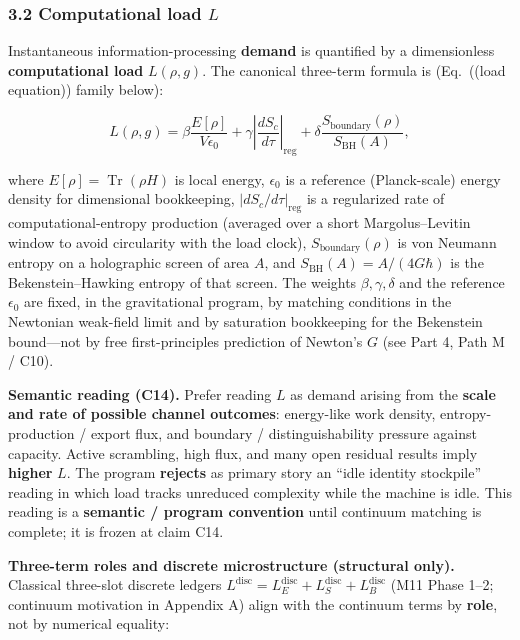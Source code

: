 \documentclass[
  11pt,
]{article}
\begin{document}
\subsubsection{\texorpdfstring{3.2 Computational load \(L\)}{3.2 Computational load L}}\label{computational-load-l}

Instantaneous information-processing \textbf{demand} is quantified by a dimensionless \textbf{computational load} \(L(\rho,g)\). The canonical three-term formula is (Eq.~((load equation)) family below):

\[
L(\rho,g)
=
\beta \frac{E[\rho]}{V \epsilon_0}
+
\gamma \left| \frac{d S_c}{d\tau} \right|_{\mathrm{reg}}
+
\delta \frac{S_{\mathrm{boundary}}(\rho)}{S_{\mathrm{BH}}(A)},
\]

where \(E[\rho]=\operatorname{Tr}(\rho H)\) is local energy, \(\epsilon_0\) is a reference (Planck-scale) energy density for dimensional bookkeeping, \(\lvert dS_c/d\tau\rvert_{\mathrm{reg}}\) is a regularized rate of computational-entropy production (averaged over a short Margolus--Levitin window to avoid circularity with the load clock), \(S_{\mathrm{boundary}}(\rho)\) is von Neumann entropy on a holographic screen of area \(A\), and \(S_{\mathrm{BH}}(A)=A/(4G\hbar)\) is the Bekenstein--Hawking entropy of that screen. The weights \(\beta,\gamma,\delta\) and the reference \(\epsilon_0\) are fixed, in the gravitational program, by matching conditions in the Newtonian weak-field limit and by saturation bookkeeping for the Bekenstein bound---not by free first-principles prediction of Newton's \(G\) (see Part 4, Path M / C10).

\textbf{Semantic reading (C14).} Prefer reading \(L\) as demand arising from the \textbf{scale and rate of possible channel outcomes}: energy-like work density, entropy-production / export flux, and boundary / distinguishability pressure against capacity. Active scrambling, high flux, and many open residual results imply \textbf{higher} \(L\). The program \textbf{rejects} as primary story an ``idle identity stockpile'' reading in which load tracks unreduced complexity while the machine is idle. This reading is a \textbf{semantic / program convention} until continuum matching is complete; it is frozen at claim C14.

\textbf{Three-term roles and discrete microstructure (structural only).} Classical three-slot discrete ledgers \(L^{\mathrm{disc}}=L_E^{\mathrm{disc}}+L_S^{\mathrm{disc}}+L_B^{\mathrm{disc}}\) (M11 Phase 1--2; continuum motivation in Appendix A) align with the continuum terms by \textbf{role}, not by numerical equality:
\end{document}
